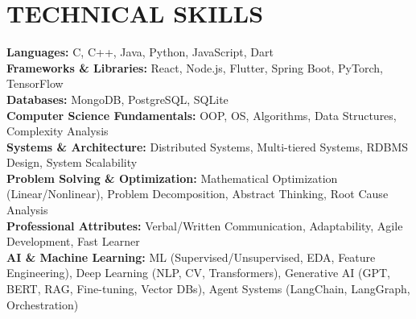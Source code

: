\documentclass[letterpaper,11pt]{article}
\begin{document}
\section{TECHNICAL SKILLS}
\begin{itemize}[leftmargin=0.15in, label={}]
    \small{\item{
        \textbf{\normalsize{Languages:}}{ \normalsize{C, C++, Java, Python, JavaScript, Dart}} \\
        \textbf{\normalsize{Frameworks \& Libraries:}}{ \normalsize{React, Node.js, Flutter, Spring Boot, PyTorch, TensorFlow}} \\
        \textbf{\normalsize{Databases:}}{ \normalsize{MongoDB, PostgreSQL, SQLite}} \\
        \textbf{\normalsize{Computer Science Fundamentals:}}{ \normalsize{OOP, OS, Algorithms, Data Structures, Complexity Analysis}} \\
        \textbf{\normalsize{Systems \& Architecture:}}{ \normalsize{Distributed Systems, Multi-tiered Systems, RDBMS Design, System Scalability}} \\
        \textbf{\normalsize{Problem Solving \& Optimization:}}{ \normalsize{Mathematical Optimization (Linear/Nonlinear), Problem Decomposition, Abstract Thinking, Root Cause Analysis}} \\
        \textbf{\normalsize{Professional Attributes:}}{ \normalsize{Verbal/Written Communication, Adaptability, Agile Development, Fast Learner}} \\
        \textbf{\normalsize{AI \& Machine Learning:}}{ \normalsize{ML (Supervised/Unsupervised, EDA, Feature Engineering), Deep Learning (NLP, CV, Transformers), Generative AI (GPT, BERT, RAG, Fine-tuning, Vector DBs), Agent Systems (LangChain, LangGraph, Orchestration)}} \\
    }}
\end{itemize}


\end{document}
